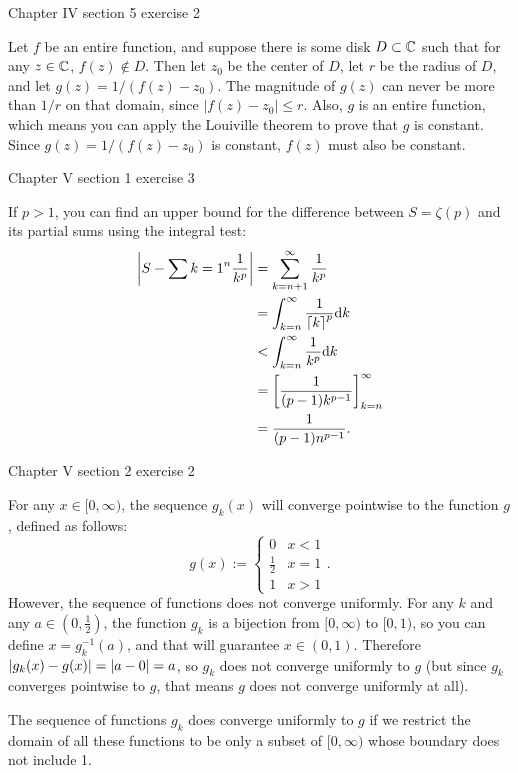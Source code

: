 \documentclass{article}
\begin{document}
\bigskip
\par
\begin{prob}
    Chapter IV section 5 exercise 2
\end{prob}
Let $f$ be an entire function, and suppose there is some disk $D \subset \mathbb{C}$ such that for any $z \in \mathbb{C}$, $f(z) \not\in D$. Then let $z_0$ be the center of $D$, let $r$ be the radius of $D$, and let $g(z)=1/(f(z)-z_0)$. The magnitude of $g(z)$ can never be more than $1/r$ on that domain, since $|f(z)-z_0| \leq r$. Also, $g$ is an entire function, which means you can apply the Louiville theorem to prove that $g$ is constant. Since $g(z)=1/(f(z)-z_0)$ is constant, $f(z)$ must also be constant.

\bigskip
\par
\begin{prob}
    Chapter V section 1 exercise 3
\end{prob}
If $p>1$, you can find an upper bound for the difference between $S=\zeta(p)$ and its partial sums using the integral test:
\begin{align*}
    \left\lvert S - \sum{k=1}^n \frac{1}{k^p} \right\rvert &= \sum_{k=n+1}^\infty \frac{1}{k^p} \\
                                        &= \int_{k=n}^\infty \frac{1}{\left\lceil k \right\rceil^p} \mathrm{d} k \\
                                        &< \int_{k=n}^\infty \frac{1}{k^p} \mathrm{d} k \\
                                        &= \left[ \frac{1}{(p-1)k^{p-1}} \right]_{k=n}^\infty \\
                                        &= \frac{1}{(p-1)n^{p-1}}.
\end{align*}

\bigskip
\par
\begin{prob}
    Chapter V section 2 exercise 2
\end{prob}
For any $x \in [0, \infty)$, the sequence $g_k(x)$ will converge pointwise to the function $g$, defined as follows:
\[ g(x) := \begin{cases}
    0 & x<1 \\
    \frac{1}{2} & x=1 \\
    1 & x>1
\end{cases}. \]
However, the sequence of functions does not converge uniformly. For any $k$ and any $a \in (0, \frac{1}{2})$, the function $g_k$ is a bijection from $[0, \infty)$ to $[0, 1)$, so you can define $x = g_k^{-1}(a)$, and that will guarantee $x \in (0, 1)$. Therefore $\left\lvert g_k(x)-g(x) \right\rvert= \left\lvert a-0 \right\rvert = a$, so $g_k$ does not converge uniformly to $g$ (but since $g_k$ converges pointwise to $g$, that means $g$ does not converge uniformly at all).
\par
The sequence of functions $g_k$ does converge uniformly to $g$ if we restrict the domain of all these functions to be only a subset of $[0, \infty)$ whose boundary does not include 1.
\end{document}

